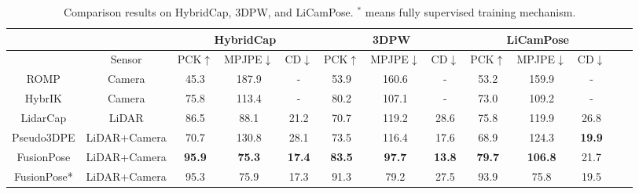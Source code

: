 \documentclass[letterpaper]{article} %
\begin{document}
\begin{table}[ht]
  \centering
    \caption{Comparison results on  HybridCap, 3DPW, and LiCamPose. 
    $^{*}$ means fully supervised training mechanism.
    }
    \label{tab:result}
    \setlength{\tabcolsep}{1mm}
\begin{tabular}{ccccccccccccc}

&                              & \multicolumn{3}{c}{HybridCap} & \multicolumn{3}{c}{3DPW}     & \multicolumn{3}{c}{LiCamPose}                          \\\hline
& \multicolumn{1}{c}{Sensor}  &
\multicolumn{1}{c}{PCK$\uparrow$} & \multicolumn{1}{c}{MPJPE$\downarrow$}
 &\multicolumn{1}{c}{CD$\downarrow$} &
 \multicolumn{1}{c}{PCK$\uparrow$} & \multicolumn{1}{c}{MPJPE$\downarrow$} &\multicolumn{1}{c}{CD$\downarrow$}
 &
 \multicolumn{1}{c}{PCK$\uparrow$} & \multicolumn{1}{c}{MPJPE$\downarrow$} &\multicolumn{1}{c}{CD$\downarrow$}
\\\hline
ROMP
& Camera         &     
45.3  & 187.9  &- &53.9&160.6&- &53.2&159.9&-%
\\\hline
 HybrIK                      &        Camera                               &                      75.8        &              113.4  & - 
 & 80.2 & 107.1 & -   
 &73.0& 109.2& -
 \\\hline
LidarCap                & LiDAR                     &        %
86.5 &    88.1 &  21.2 %
&70.7& 119.2 &28.6 %
&75.8&119.9&26.8 %
\\\hline\hline
Pseudo3DPE   & LiDAR+Camera               &70.7 &130.8 & 28.1  
    
& 73.5 & 116.4 &17.6
& 68.9 & 124.3 & \textbf{19.9}&  
\\\hline
FusionPose         & LiDAR+Camera    
&         \textbf{95.9} & \textbf{75.3} & \textbf{17.4}%
& \textbf{83.5} &\textbf{97.7} &\textbf{13.8}%
&\textbf{79.7}&\textbf{106.8}&21.7%
\\\hline  
{FusionPose*  }       & {LiDAR+Camera }   
&         {95.3} &{75.9} & {17.3}%
& {91.3} &{79.2} &{27.5}%
&{93.9}&{75.8}&{19.5}%
\\\hline                
\end{tabular}
\vspace{-1ex}
\end{table}
\end{document}
